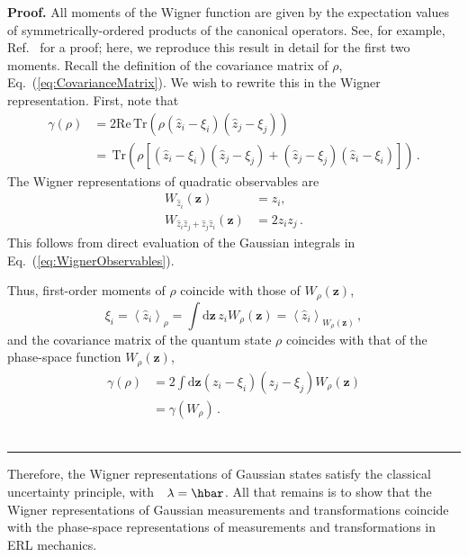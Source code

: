\documentclass[pra,superscriptaddress,nofootinbib,12pt]{revtex4-2}
\newenvironment{proof}[1][Proof]{\noindent\textbf{#1.} }{\ \rule{0.5em}{0.5em}}
\begin{document}
\begin{proof}
All moments of the Wigner function are given by the expectation values of symmetrically-ordered products of the canonical operators.  See, for example, Ref.~\cite{GardinerZoller} for a proof; here, we reproduce this result in detail for the first two moments.  Recall the definition of the covariance matrix of $\rho$, Eq.~(\ref{eq:CovarianceMatrix}).  We wish to rewrite this in
the Wigner representation.  First, note that
\begin{align}
  \gamma (\rho) &= 2\mathrm{Re}\,\mathrm{Tr}\left( \rho(\hat{z}_{i}-\xi _{i})(\hat{z}_{j}-\xi _{j})\right)
  \nonumber \\
  &=\,\mathrm{Tr}\left( \rho\left[ (\hat{z}_{i}-\xi _{i})(\hat{z}_{j}-\xi _{j})
  +(\hat{z}_{j}-\xi _{j})(\hat{z}_{i}-\xi _{i})\right]\right)\, .
\end{align}
The Wigner representations of quadratic observables are
\begin{align}
  W_{\hat{z}_{i}}(\mathbf{z}) &= z_{i}, \\
  W_{\hat{z}_{i}\hat{z}_{j}+\hat{z}_{j}\hat{z}_{i}}(\mathbf{z})
  &=2z_{i}z_{j}\,.
\end{align}
This follows from direct evaluation of the Gaussian integrals in Eq.~(\ref{eq:WignerObservables}).

Thus, first-order moments of $\rho$ coincide with those of $W_{\rho}(\mathbf{z})$,
\begin{equation}
  \xi_i =\left\langle \hat{z}_{i}\right\rangle _{\rho}
  =\int \mathrm{d}\mathbf{z}\,z_{i}W_{\rho}(\mathbf{z})
  =\left\langle \hat{z}_{i}\right\rangle_{W_{\rho}(\mathbf{z})} \,,
\end{equation}
and the covariance matrix of the quantum state $\rho$ coincides with
that of the phase-space function $W_{\rho}(\mathbf{z})$,
\begin{align}
  \gamma (\rho) &=2\int \mathrm{d}\mathbf{z}(z_{i}-\xi_{i})(z_{j}-\xi_{j})W_{\rho}(\mathbf{z}) \nonumber \\
  &=\gamma (W_{\rho})\,.
\end{align}
\end{proof}

Therefore, the Wigner representations of Gaussian states satisfy the classical uncertainty principle, with $\lambdabar = \hbar$.  All that remains is to show that the Wigner representations of Gaussian measurements and transformations coincide with the phase-space representations of measurements and transformations in ERL mechanics.
\end{document}
